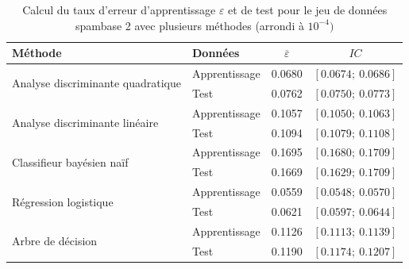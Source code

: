 \documentclass[a4paper,11pt,oneside,roman]{article}
\begin{document}
\begin{table}[H]
\centering

\begin{tabular}{l|l|cc}
\multicolumn{1}{l|}{\textbf{Méthode}}    & \textbf{Données} &$ \overline{\varepsilon}$ & $IC$                      \\ \hline
\multirow{2}{*}{Analyse discriminante quadratique} & Apprentissage    & 0.0680                   & $\left[0.0674 ;~ 0.0686 \right]$  \\
                                       & Test             & 0.0762            & $\left[0.0750  ;~ 0.0773 \right]$ \\ \hline
\multirow{2}{*}{Analyse discriminante linéaire}                  & Apprentissage & 0.1057                                 & $\left[0.1050 ;~ 0.1063 \right]$  \\
                                       & Test             & 0.1094                      & $\left[0.1079  ;~0.1108 \right]$ \\ \hline
\multirow{2}{*}{Classifieur bayésien naïf}                  & Apprentissage    &  0.1695                            & $\left[0.1680 ;~ 0.1709 \right]$  \\
                                       & Test             & 0.1669                                 & $\left[0.1629 ;~0.1709 \right]$ \\ \hline
\multirow{2}{*}{Régression logistique }                  & Apprentissage    &  0.0559                             & $\left[ 0.0548 ;~ 0.0570 \right]$  \\
                                       & Test             & 0.0621                                 & $\left[0.0597;~ 0.0644 \right]$ \\ \hline
\multirow{2}{*}{Arbre de décision}                  & Apprentissage    &  0.1126                             & $\left[0.1113 ;~ 0.1139 \right]$  \\
                                       & Test             &  0.1190                                 & $\left[0.1174 ;~ 0.1207 \right]$ 
\end{tabular}

\caption{Calcul du taux d'erreur d'apprentissage $\varepsilon$ et de test pour le jeu de données spambase 2 avec plusieurs méthodes (arrondi à $10^{-4})$}
\label{spambase2}
\end{table}
\end{document}
